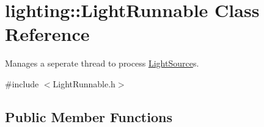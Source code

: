 \hypertarget{classlighting_1_1LightRunnable}{}\section{lighting\+:\+:Light\+Runnable Class Reference}
\label{classlighting_1_1LightRunnable}


Manages a seperate thread to process \hyperlink{classlighting_1_1LightSource}{Light\+Source}s.  




{\ttfamily \#include $<$Light\+Runnable.\+h$>$}

\subsection*{Public Member Functions}

